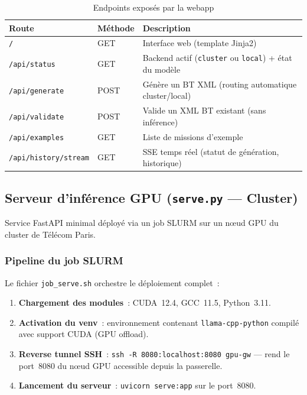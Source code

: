 \documentclass[a4paper,11pt]{article}
\newcommand{\file}[1]{\texttt{#1}}
\newcommand{\apiep}[1]{\texttt{#1}}
\begin{document}
\begin{table}[H]
\centering
\caption{Endpoints exposés par la webapp}
\label{tab:endpoints}
\begin{tabularx}{\textwidth}{@{}l l X@{}}
\toprule
\textbf{Route} & \textbf{Méthode} & \textbf{Description} \\
\midrule
\apiep{/}              & GET  & Interface web (template Jinja2) \\
\apiep{/api/status}    & GET  & Backend actif (\texttt{cluster} ou \texttt{local}) + état du modèle \\
\apiep{/api/generate}  & POST & Génère un BT XML (routing automatique cluster/local) \\
\apiep{/api/validate}  & POST & Valide un XML BT existant (sans inférence) \\
\apiep{/api/examples}  & GET  & Liste de missions d'exemple \\
\apiep{/api/history/stream} & GET & SSE temps réel (statut de génération, historique) \\
\bottomrule
\end{tabularx}
\end{table}

\subsection{Serveur d'inférence GPU (\file{serve.py} --- Cluster)}
\label{sec:serve}

Service FastAPI minimal déployé via un job SLURM sur un nœud GPU du
cluster de Télécom Paris.

\subsubsection{Pipeline du job SLURM}

Le fichier \file{job\_serve.sh} orchestre le déploiement complet~:

\begin{enumerate}
    \item \textbf{Chargement des modules}~: CUDA~12.4, GCC~11.5, Python~3.11.
    \item \textbf{Activation du venv}~: environnement contenant
    \texttt{llama-cpp-python} compilé avec support CUDA (GPU offload).
    \item \textbf{Reverse tunnel SSH}~: \texttt{ssh -R 8080:localhost:8080
    gpu-gw} --- rend le port~8080 du nœud GPU accessible depuis la passerelle.
    \item \textbf{Lancement du serveur}~: \texttt{uvicorn serve:app} sur le
    port~8080.
\end{enumerate}
\end{document}
